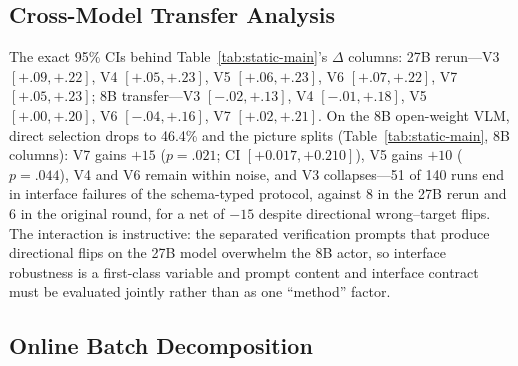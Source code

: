 \subsection{Cross-Model Transfer Analysis}\label{app:transfer}
The exact 95\% CIs behind Table~\ref{tab:static-main}'s
$\Delta$ columns: 27B rerun---V3 $[+.09,+.22]$, V4
$[+.05,+.23]$, V5 $[+.06,+.23]$, V6 $[+.07,+.22]$, V7
$[+.05,+.23]$; 8B transfer---V3 $[-.02,+.13]$, V4
$[-.01,+.18]$, V5 $[+.00,+.20]$, V6 $[-.04,+.16]$, V7
$[+.02,+.21]$.
On the 8B open-weight VLM, direct selection drops to
46.4\% and the picture splits
(Table~\ref{tab:static-main}, 8B columns): V7 gains
$+15$ ($p=.021$; CI $[+0.017, +0.210]$), V5 gains
$+10$ ($p=.044$), V4 and V6 remain within noise, and
V3 collapses---51 of 140 runs end in interface failures
of the schema-typed protocol, against 8 in the 27B
rerun and 6 in the original round, for a net of $-15$
despite directional
wrong--target flips.
The interaction is instructive: the separated
verification prompts that produce directional flips on
the 27B model overwhelm the 8B actor, so interface
robustness is a first-class variable and prompt content
and interface contract must be evaluated jointly rather
than as one ``method'' factor.



\subsection{Online Batch Decomposition}\label{app:online-table}

